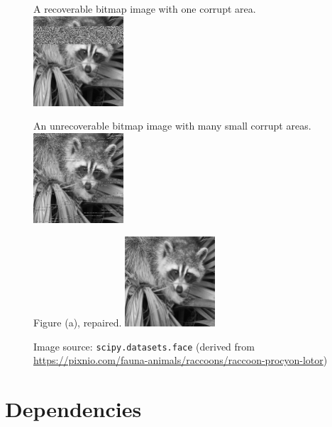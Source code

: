 \begin{figure}[H]
    \centering
    \begin{subcaptionbox}{A recoverable bitmap image with one corrupt area.}
        {\includegraphics[width=0.3\textwidth]{face_2.png}}
    \end{subcaptionbox}
    \hfill
    \begin{subcaptionbox}{An unrecoverable bitmap image with many small corrupt areas.}
        {\includegraphics[width=0.3\textwidth]{face_3.png}}
    \end{subcaptionbox}
    \hfill
    \begin{subcaptionbox}{Figure (a), repaired.}
        {\includegraphics[width=0.3\textwidth]{face_2_repaired.png}}
    \end{subcaptionbox}
    
    \caption{Image source: \texttt{scipy.datasets.face} (derived from \url{https://pixnio.com/fauna-animals/raccoons/raccoon-procyon-lotor})}
\end{figure}

\clearpage

\section{Dependencies}


